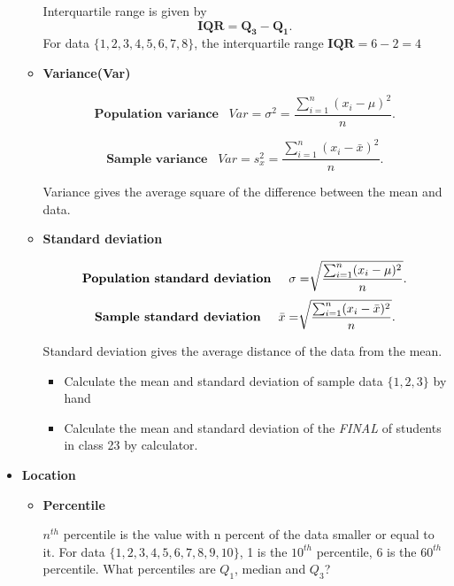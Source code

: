 \documentclass[a4paper, 12pt,twoside]{book}
\begin{document}
\begin{itemize}
\begin{itemize}
Interquartile range is given by $$\textbf{IQR} = \mathbf{Q_3} - \mathbf{Q_1}.$$
For data $\{1,2,3,4,5,6,7,8\}$, the interquartile range $\textbf{IQR} = 6-2=4$

\item \textbf{Variance(Var)}

$$\textbf{Population variance}\;\;\;Var=\sigma^2=\frac{\sum_{i=1}^{n}(x_i-\mu)^2}{n}.$$

$$\textbf{Sample variance}\;\;\;Var=s_x^2=\frac{\sum_{i=1}^{n}(x_i-\bar{x})^2}{n}.$$

Variance gives the average square of the difference between the mean and data.

\item \textbf{Standard deviation}

$$\textbf{Population standard deviation}\hspace{0.5cm}\sigma=\sqrt[]{\frac{\sum_{i=1}^{n}(x_i-\mu)^2}{n}}.$$
$$\textbf{Sample standard deviation}\hspace{0.5cm}\bar{x}=\sqrt[]{\frac{\sum_{i=1}^{n}(x_i-\bar{x})^2}{n}}.$$

\colorbox{babypink}{Standard deviation gives the average distance of the data from the mean.}
\begin{itemize}
\item \colorbox{dollarbill}{\parbox{13.2cm}{Calculate the mean and standard deviation of sample data $\{1, 2, 3\}$ by hand}}
\vspace{1cm}
\item \colorbox{dollarbill}{\parbox{13.2cm}{Calculate the mean and standard deviation of the \textit{FINAL} of students in class 23 by calculator.}}
\vspace{1cm}
\end{itemize}


\end{itemize}
\item \textbf{Location}
\begin{itemize}
\item \textbf{Percentile}

$n^{th}$ percentile is the value with n percent of the data smaller or equal to it. For data $\{1, 2, 3, 4, 5, 6, 7, 8, 9, 10\}$, 1 is the $10^{th}$ percentile, 6 is the $60^{th}$ percentile.
\colorbox{dollarbill}{What percentiles are $Q_1$, median and $Q_3$?}
\vspace{1cm}

\begin{itemize}


\end{itemize}
\end{itemize}
\end{itemize}
\end{document}
